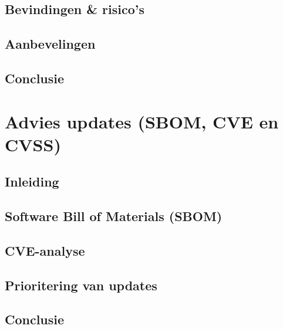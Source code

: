 \documentclass[11pt, a4paper]{report}
\begin{document}
\section{Bevindingen \& risico's}

\section{Aanbevelingen}

\section{Conclusie}


\chapter{Advies updates (SBOM, CVE en CVSS)}

\section{Inleiding}

\section{Software Bill of Materials (SBOM)}

\section{CVE-analyse}

\section{Prioritering van updates}

\section{Conclusie}
\end{document}
